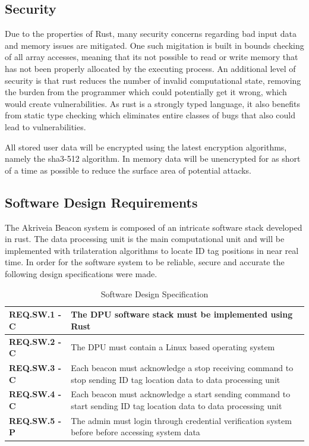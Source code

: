 \medskip
\subsection{Security}
\medskip
Due to the properties of Rust, many security concerns regarding bad input data and memory issues are mitigated.
One such migitation is built in bounds checking of all array accesses, meaning that its not possible to read or write memory that has not been properly allocated by the executing process.
An additional level of security is that rust reduces the number of invalid computational state, removing the burden from the programmer which could potentially get it wrong, which would create vulnerabilities.
As rust is a strongly typed language, it also benefits from static type checking which eliminates entire classes of bugs that also could lead to vulnerabilities.

\bigskip
All stored user data will be encrypted using the latest encryption algorithms, namely the sha3-512 algorithm.
In memory data will be unencrypted for as short of a time as possible to reduce the surface area of potential attacks.

\pagebreak
\subsection{Software Design Requirements}
\medskip
The Akriveia Beacon system is composed of an intricate software stack developed in rust.
The data processing unit is the main computational unit and will be implemented with trilateration algorithms to locate ID tag positions in near real time.
In order for the software system to be reliable, secure and accurate the following design specifications were made.

\medskip
\bgroup
\def\arraystretch{1.5}
\begin{table}[H]
\centering
\begin{tabular}{ | m{3cm} | m{12.5cm} |}
\hline
\textbf{REQ.SW.1 - C} &  The DPU software stack must be implemented using Rust  \\
\hline
\textbf{REQ.SW.2 - C} &  The DPU must contain a Linux based operating system  \\
\hline
\textbf{REQ.SW.3 - C} &  Each beacon must acknowledge a stop receiving command to stop sending ID tag location data to data processing unit \\
\hline
\textbf{REQ.SW.4 - C} &  Each beacon must acknowledge a start sending command to start sending ID tag location data to data processing unit  \\
\hline
\textbf{REQ.SW.5 - P} &  The admin must login through credential verification system before before accessing system data \\
\hline
\end{tabular}
\caption{Software Design Specification}
\end{table}



